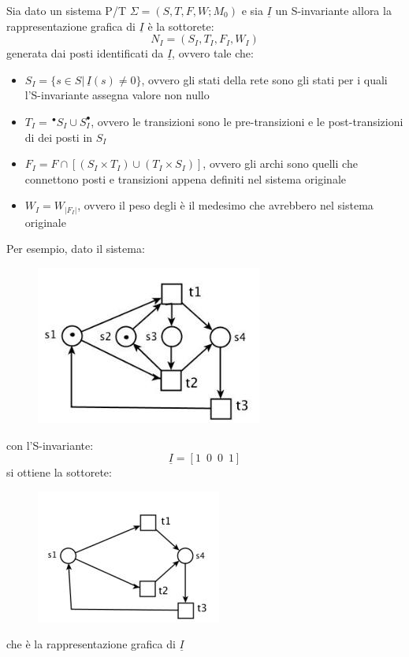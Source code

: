 \documentclass[a4paper,12pt, oneside]{book}
\begin{document}
\begin{definizione}
  Sia dato un sistema P/T $\Sigma=(S,T,F,W;M_0)$ e sia $\underline{I}$ un
  S-invariante allora la rappresentazione grafica di $\underline{I}$ è la
  sottorete:
  \[N_I=(S_I,T_I,F_I,W_I)\]
  generata dai posti identificati da $\underline{I}$, ovvero tale che:
  \begin{itemize}
    \item $S_I=\{s\in S|\,\underline{I}(s)\neq 0\}$, ovvero gli stati della rete
    sono gli stati per i quali l'S-invariante assegna valore non nullo
    \item $T_I=\,^\bullet S_I\cup S_I^\bullet$, ovvero le transizioni sono le
    pre-transizioni e le post-transizioni di dei posti in $S_I$
    \item $F_I=F\cap [(S_I\times T_I)\cup (T_I\times S_I)]$, ovvero gli archi
    sono quelli che connettono posti e transizioni appena definiti nel sistema
    originale 
    \item $W_I=W_{|F_I|}$, ovvero il peso degli è il medesimo che avrebbero nel
    sistema originale
  \end{itemize}
  \newpage
  \begin{esempio}
    Per esempio, dato il sistema:
    \begin{figure}[H]
      \centering
      \includegraphics[scale = 0.6]{img/si7.jpg}
    \end{figure}
    con l'S-invariante:
    \[\underline{I}=[1\,\,\,0\,\,\,0\,\,\,1]\]
    si ottiene la sottorete:
    \begin{figure}[H]
      \centering
      \includegraphics[scale = 0.6]{img/si8.jpg}
    \end{figure}
    che è la rappresentazione grafica di $\underline{I}$
  \end{esempio}
\end{definizione}
\end{document}
